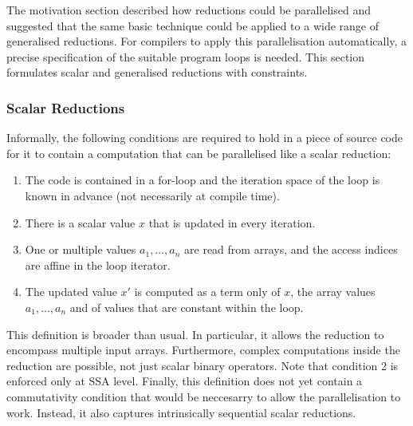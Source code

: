     The motivation section described how reductions could be parallelised and
    suggested that the same basic technique could be applied to a wide range of
    generalised reductions.
    For compilers to apply this parallelisation automatically, a precise
    specification of the suitable program loops is needed.
    This section formulates scalar and generalised reductions with constraints.

\subsubsection{Scalar Reductions}
\label{section:scalarcond}

    Informally, the following conditions are required to hold in a piece of
    source code for it to contain a computation that can be parallelised like a
    scalar reduction:
    \begin{enumerate}
        \item The code is contained in a for-loop and the iteration space of the
              loop is known in advance (not necessarily at compile time).
        \item There is a scalar value $x$ that is updated in every iteration.
        \item One or multiple values $a_1,\dots,a_n$ are read from arrays, and
              the access indices are affine in the loop iterator.
        \item The updated value $x'$ is computed as a term only of $x$, the
              array values $a_1,\dots,a_n$ and of values that are constant
              within the loop.
    \end{enumerate}

    This definition is broader than usual.
    In particular, it allows the reduction to encompass multiple input arrays.
    Furthermore, complex computations inside the reduction are possible, not
    just scalar binary operators.
    Note that condition 2 is enforced only at SSA level.
    Finally, this definition does not yet contain a commutativity condition that
    would be neccesarry to allow the parallelisation to work.
    Instead, it also captures intrinsically sequential scalar reductions.

